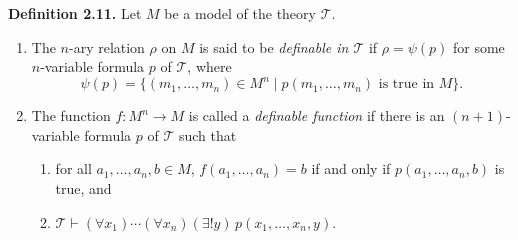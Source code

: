 \textbf{Definition 2.11.} Let $M$ be a model of the theory $\mathcal{T}$.

\begin{enumerate}
  \item The $n$-ary relation $\rho$ on $M$ is said to be \textit{definable in $\mathcal{T}$} if $\rho = \psi(p)$ for some $n$-variable formula $p$ of $\mathcal{T}$, where
  \[
  \psi(p) = \{(m_1, \ldots, m_n) \in M^n \mid p(m_1, \ldots, m_n) \text{ is true in } M\}.
  \]
  
  \item The function $f: M^n \to M$ is called a \textit{definable function} if there is an $(n + 1)$-variable formula $p$ of $\mathcal{T}$ such that
  \begin{enumerate}
    \item[(i)] for all $a_1, \ldots, a_n, b \in M$, $f(a_1, \ldots, a_n) = b$ if and only if $p(a_1, \ldots, a_n, b)$ is true, and
    \item[(ii)] $\mathcal{T} \vdash (\forall x_1) \cdots (\forall x_n)(\exists! y)\, p(x_1, \ldots, x_n, y)$.
  \end{enumerate}
\end{enumerate}
